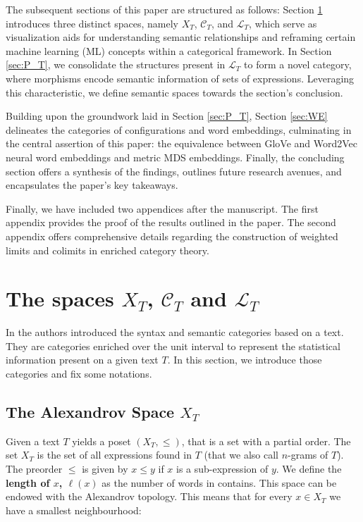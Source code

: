 \documentclass[10pt,a4paper]{elsarticle}
\newcommand{\C}{\mathcal{C}}
\renewcommand{\L}{\mathcal{L}}
\begin{document}
The subsequent sections of this paper are structured as follows: Section \ref{sec:Spaces} introduces three distinct spaces, namely $ X_{T}$, $\C_{T}$, and $\L_{T}$, which serve as visualization aids for understanding semantic relationships and reframing certain machine learning (ML) concepts within a categorical framework. In Section \ref{sec:P_T}, we consolidate the structures present in $\L_{T}$ to form a novel category, where morphisms encode semantic information of sets of expressions. Leveraging this characteristic, we define semantic spaces towards the section's conclusion.

Building upon the groundwork laid in Section \ref{sec:P_T}, Section \ref{sec:WE} delineates the categories of configurations and word embeddings, culminating in the central assertion of this paper: the equivalence between GloVe and Word2Vec neural word embeddings and metric MDS embeddings. Finally, the concluding section offers a synthesis of the findings, outlines future research avenues, and encapsulates the paper's key takeaways.

Finally, we have included two appendices after the manuscript. The first appendix provides the proof of the results outlined in the paper. The second appendix offers comprehensive details regarding the construction of weighted limits and colimits in enriched category theory.


\section{The spaces $X_{T}$, $\mathcal{C}_{T}$ and $\mathcal{L}_{T}$}\label{sec:Spaces}
In \citep{CatSem} the authors introduced the syntax and semantic categories based on a text. They are categories enriched over the unit interval to represent the statistical information present on a given text $T$. In this section, we introduce those categories and fix some notations.

\subsection{The Alexandrov Space $X_{T}$}

Given a text $T$ yields a poset $(X_{T},\leq)$, that is a set with a partial order. The set $X_{T}$ is the set of all expressions found in $T$ (that we also call $n$-grams of $T$). The preorder $\leq$ is given by $x\leq y$ if $x$ is a sub-expression of $y$. We define the \textbf{length of $x$, $ \ell(x)$} as the number of words in contains. This space can be endowed with the Alexandrov topology. This means that for every $x\in X_{T}$ we have a smallest neighbourhood:
\end{document}
